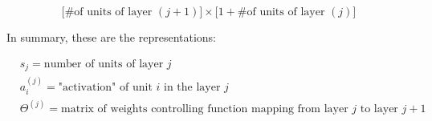 $$\Big[\text{\# of units of layer } (j + 1)\Big] \times \Big[1 + \text{\# of units of layer } (j)\Big]$$

\newpage

\noindent In summary, these are the representations:

\begin{align*}
	& s_j = \text{number of units of layer } j \\
	& a^{(j)}_i = \text{"activation" of unit } i \text{ in the layer } j \\
	& \Theta^{(j)} = \text{matrix of weights controlling function mapping from layer } j \text{ to layer } j + 1 \\ 
\end{align*}